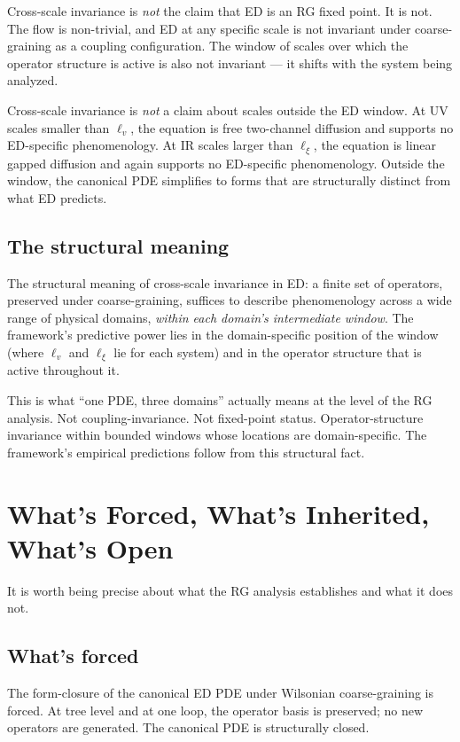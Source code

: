 \documentclass[11pt,a4paper]{article}
\begin{document}
Cross-scale invariance is \emph{not} the claim that ED is an RG fixed point. It is not. The flow is non-trivial, and ED at any specific scale is not invariant under coarse-graining as a coupling configuration. The window of scales over which the operator structure is active is also not invariant --- it shifts with the system being analyzed.

Cross-scale invariance is \emph{not} a claim about scales outside the ED window. At UV scales smaller than $\ell_v$, the equation is free two-channel diffusion and supports no ED-specific phenomenology. At IR scales larger than $\ell_\xi$, the equation is linear gapped diffusion and again supports no ED-specific phenomenology. Outside the window, the canonical PDE simplifies to forms that are structurally distinct from what ED predicts.

\subsection{The structural meaning}

The structural meaning of cross-scale invariance in ED: a finite set of operators, preserved under coarse-graining, suffices to describe phenomenology across a wide range of physical domains, \emph{within each domain's intermediate window}. The framework's predictive power lies in the domain-specific position of the window (where $\ell_v$ and $\ell_\xi$ lie for each system) and in the operator structure that is active throughout it.

This is what ``one PDE, three domains'' actually means at the level of the RG analysis. Not coupling-invariance. Not fixed-point status. Operator-structure invariance within bounded windows whose locations are domain-specific. The framework's empirical predictions follow from this structural fact.

\section{What's Forced, What's Inherited, What's Open}

It is worth being precise about what the RG analysis establishes and what it does not.

\subsection{What's forced}

The form-closure of the canonical ED PDE under Wilsonian coarse-graining is forced. At tree level and at one loop, the operator basis is preserved; no new operators are generated. The canonical PDE is structurally closed.
\end{document}
